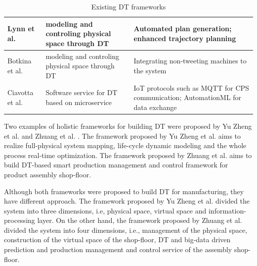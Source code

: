 \documentclass[article,table]{aaltoseries}
\begin{document}
\begin{table}[]
\begin{tabular}{|l|p{4.5cm}|p{7.3cm}|}
		Lynn et al. \cite{lynn2018realization}                                                          & modeling and controling physical space through DT                                     & Automated plan generation; enhanced trajectory planning                                                                                                                                                                                                             \\ \hline
		Botkina et al. \cite{botkina2018digital}                                                           & modeling and controling physical space through DT                                     & Integrating non-tweeting machines to the system                                                                                                                                                                                                                     \\ \hline
		Ciavotta et al. \cite{ciavotta2017microservice} & Software service for DT based on microservice                                         & IoT protocols such as MQTT for CPS communication; AutomationML for data exchange                                                                                                                                                                                    \\ \hline
	\end{tabular}
	\caption{Existing DT frameworks}
	\label{tab:framework_tools}
\end{table}

Two examples of holistic frameworks for building DT were proposed by Yu Zheng et al. \cite{zheng2019application} and Zhuang et al. \cite{Zhuang2018}. The framework proposed by Yu Zheng et al. aims to realize full-physical system mapping, life-cycle dynamic modeling and the whole process real-time optimization. The framework proposed by Zhuang et al. aims to build DT-based smart production management and control framework for product assembly shop-floor.

Although both frameworks were proposed to build DT for manufacturing, they have different approach. The framework proposed by Yu Zheng et al. divided the system into three dimensions, i.e, physical space, virtual space and information-processing layer. On the other hand, the framework proposed by Zhuang et al. divided the system into four dimensions, i.e., management of the physical space, construction of the virtual space of the shop-floor, DT and big-data driven prediction and production management and control service of the assembly shop-floor.
\end{document}
